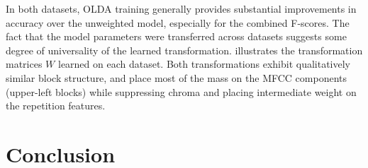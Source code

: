 \documentclass{article}
\begin{document}
In both datasets, OLDA training generally provides substantial improvements in accuracy over the unweighted model, 
especially for the combined F-scores.
The fact that the model parameters were transferred across datasets suggests some degree of universality of the
learned transformation.   illustrates the transformation matrices $W$ learned on each dataset. Both
transformations exhibit qualitatively similar block structure, and place most of the mass on the MFCC components
(upper-left blocks) while suppressing chroma and placing intermediate weight on the repetition features.



\section{Conclusion}
\label{sec:conclusion}




\end{document}
